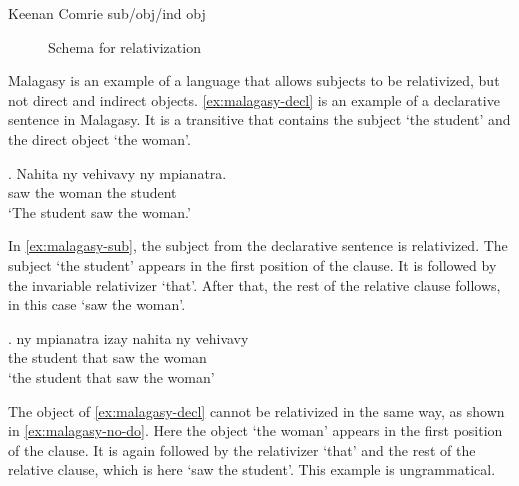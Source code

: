 Keenan Comrie sub/obj/ind obj


\begin{figure}[H]
  \centering
  \caption{Schema for relativization}
  \label{fig:relativization}
\end{figure}

Malagasy is an example of a language that allows subjects to be relativized, but not direct and indirect objects. \ref{ex:malagasy-decl} is an example of a declarative sentence in Malagasy. It is a transitive that contains the subject  `the student' and the direct object  `the woman'.

\exg. Nahita ny vehivavy ny mpianatra.\\
 saw the woman the student\\
 `The student saw the woman.' \label{ex:malagasy-decl}

In \ref{ex:malagasy-sub}, the subject from the declarative sentence is relativized. The subject  `the student' appears in the first position of the clause. It is followed by the invariable relativizer  `that'. After that, the rest of the relative clause follows, in this case  `saw the woman'.

\exg. ny mpianatra izay nahita ny vehivavy\\
 the student that saw the woman\\
 `the student that saw the woman' \label{ex:malagasy-sub}

The object of \ref{ex:malagasy-decl} cannot be relativized in the same way, as shown in \ref{ex:malagasy-no-do}. Here the object  `the woman' appears in the first position of the clause. It is again followed by the relativizer  `that' and the rest of the relative clause, which is here  `saw the student'. This example is ungrammatical.

